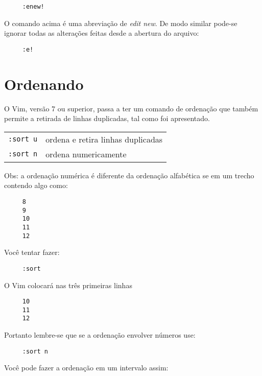 \begin{verbatim}
     :enew!
\end{verbatim}

O comando acima é uma abreviação de {\em edit new}. De modo similar pode-se
ignorar todas as alterações feitas desde a abertura do arquivo:

\begin{verbatim}
     :e!
\end{verbatim}

\section{Ordenando}

O Vim, versão 7 ou superior, passa a ter um comando de ordenação que também 
permite a retirada de linhas duplicadas, tal como foi apresentado.
\begin{table}[htb]\begin{center} \begin{tabular}{ll} \hline
     \verb|:sort u| & ordena e retira linhas duplicadas\\
     \verb|:sort n| & ordena numericamente\\
\hline \end{tabular}\end{center}\end{table}

Obs: a ordenação numérica é diferente da ordenação alfabética se em um
trecho contendo algo como:

\begin{verbatim}
     8
     9
     10
     11
     12
\end{verbatim}

Você tentar fazer:

\begin{verbatim}
     :sort
\end{verbatim}

O Vim colocará nas três primeiras linhas

\begin{verbatim}
     10
     11
     12
\end{verbatim}

Portanto lembre-se que se a ordenação envolver números use:

\begin{verbatim}
     :sort n
\end{verbatim}

Você pode fazer a ordenação em um intervalo assim:

